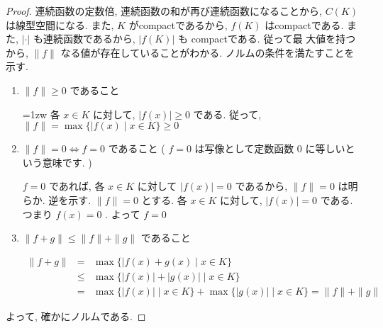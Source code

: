 \documentclass[dvipdfmx,uplatex,11pt]{jsarticle}
\begin{document}
\begin{leftbar}
	\begin{proof}
	連続函数の定数倍, 連続函数の和が再び連続函数になることから, $C ( K )$ は線型空間になる. また, $K$ がcompactであるから, $f ( K )$ はcompactである. また, $| \cdot |$ も連続函数であるから, $| f ( K ) |$ も compactである. 従って最
	大値を持つから, $\| f \|$ なる値が存在していることがわかる. ノルムの条件を満たすことを示す. 
		\begin{enumerate}
			\item $\| f \| \geq 0$ であること
				
				\parindent=1zw 各 $x \in K$ に対して, $| f ( x ) | \geq 0$ である. 従って, $\| f \| = \max \{ | f ( x ) \mid x \in K \} \geq 0$
				
			\item $\| f \| = 0 \Leftrightarrow f = 0$ であること ( $f = 0$ は写像として定数函数 $0$ に等しいという意味です. )	
				
				$f = 0$ であれば, 各 $x \in K$ に対して $| f ( x ) | = 0$ であるから, $\| f \| = 0$ は明らか. 逆を示す. $\| f \| = 0$ とする. 各 $x \in K$ に対して, $| f ( x ) | = 0$ である. つまり $f ( x ) = 0$ . よって $f = 0$
				
			\item $\| f + g \| \leq \| f \| + \| g \|$ であること
			
				\begin{eqnarray*}
					\| f + g \| & = & \max \{ | f ( x ) + g ( x ) \mid x \in K \} \\
					& \leq & \max \{ | f ( x ) | + | g ( x ) | \mid x \in K \} \\
					& = & \max \{ | f ( x ) |  \mid x \in K \} + \max \{ | g ( x ) |  \mid x \in K \} = \| f \| + \| g \|
				\end{eqnarray*}
		\end{enumerate}
	よって, 確かにノルムである. 
\end{proof}
\end{leftbar}
\newpage
\end{document}
